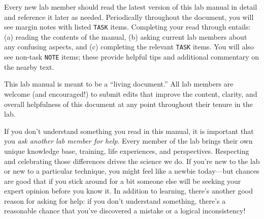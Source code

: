 \documentclass{tufte-book} %
\begin{document}
\noindent {}  Every new lab member should read the latest version of this
lab manual in detail and reference it later as needed.  Periodically
throughout the document, you will see margin notes with listed
\texttt{TASK} items.  Completing your read through entails: (a)
reading the contents of the manual, (b) asking current lab members
about any confusing aspects, and (c) completing the relevant
\texttt{TASK} items.  You will also see non-task \texttt{NOTE} items;
these provide helpful tips and additional commentary on the nearby
text.

This lab manual is meant to be a ``living document.'' All lab members
are welcome (and encouraged!) to submit edits that improve the
content, clarity, and overall helpfulness of this document at any
point throughout their tenure in the lab.


\noindent {} If you don't understand something you
read in this manual, it is important that you \textit{ask another lab
  member for help}.  Every member of the lab brings their own unique
knowledge base, training, life experiences, and perspectives.
Respecting and celebrating those differences drives the science we do.
If you're new to the lab or new to a particular technique, you might
feel like a newbie today---but chances are good that if you stick
around for a bit someone else will be seeking your expert opinion
before you know it.  In addition to learning, there's another good
reason for asking for help: if you don't understand something, there's
a reasonable chance that you've discovered a mistake or a logical
inconsistency!
\end{document}
